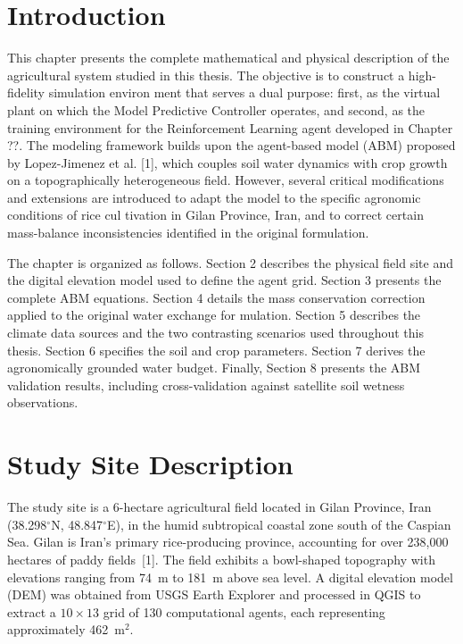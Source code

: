\documentclass[12pt, a4paper]{article}
\begin{document}


\tableofcontents

\newpage

\section{Introduction}

This chapter presents the complete mathematical and physical description of the agricultural
system studied in this thesis. The objective is to construct a high-fidelity simulation environ
ment that serves a dual purpose: first, as the virtual plant on which the Model Predictive
Controller operates, and second, as the training environment for the Reinforcement Learning
agent developed in Chapter ??. The modeling framework builds upon the agent-based model
(ABM) proposed by Lopez-Jimenez et al. [1], which couples soil water dynamics with crop
growth on a topographically heterogeneous field. However, several critical modifications and
extensions are introduced to adapt the model to the specific agronomic conditions of rice cul
tivation in Gilan Province, Iran, and to correct certain mass-balance inconsistencies identified
in the original formulation.


The chapter is organized as follows. Section 2 describes the physical field site and the digital
elevation model used to define the agent grid. Section 3 presents the complete ABM equations.
Section 4 details the mass conservation correction applied to the original water exchange for
mulation. Section 5 describes the climate data sources and the two contrasting scenarios used
throughout this thesis. Section 6 specifies the soil and crop parameters. Section 7 derives the
agronomically grounded water budget. Finally, Section 8 presents the ABM validation results,
including cross-validation against satellite soil wetness observations.

\section{Study Site Description}

The study site is a 6-hectare agricultural field located in Gilan Province, Iran (38.298$^{\circ}$N, 48.847$^{\circ}$E), in the humid subtropical coastal zone south of the Caspian Sea. Gilan is Iran's primary rice-producing province, accounting for over 238,000 hectares of paddy fields~[1]. The field exhibits a bowl-shaped topography with elevations ranging from 74~m to 181~m above sea level. A digital elevation model (DEM) was obtained from USGS Earth Explorer and processed in QGIS to extract a $10 \times 13$ grid of 130 computational agents, each representing approximately 462~m$^{2}$.
\end{document}
